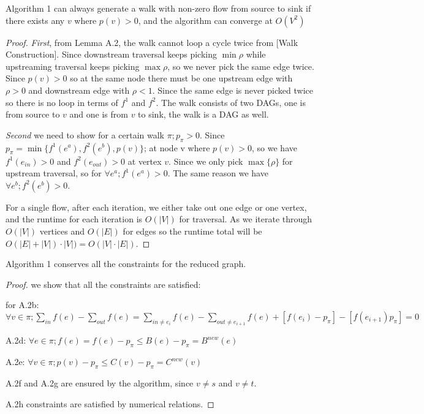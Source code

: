 \begin{lemma}   Algorithm 1 can always generate a walk with non-zero flow from source to sink if there exists any $v$ where $p(v) >0$, and the algorithm can converge at $O(V^2)$ \end{lemma}
\begin{proof}
\textit{First}, from Lemma A.2, the walk cannot loop a cycle twice from [Walk Construction]. Since downstream traversal keeps picking $\min \rho$ while upstreaming traversal keeps picking $\max \rho$, so we never pick the same edge twice. Since $p(v)>0$ so at the same node there must be one upstream edge with $\rho>0$ and downstream edge with $\rho<1$. Since the same edge is never picked twice so there is no loop in terms of $f^1$ and $f^2$. The walk consists of two DAGs, one is from source to $v$ and one is from $v$ to sink, the walk is a DAG as well.

\textit{Second} we need to show for a certain walk $\pi; p_\pi>0$. Since $p_\pi =  \min\{f^1(e^a), f^2(e^b), p(v)\}$; at node v where $p(v)>0$, so we have $f^1(e_{in})>0$ and $f^2(e_{out})>0$ at vertex $v$. Since we only pick $\max\{\rho\}$ for upstream traversal, so for $\forall e^a; f^1(e^a)>0$. The same reason we have $\forall e^b; f^2(e^b)>0$.

For a single flow, after each iteration, we either take out one edge or one vertex, and the runtime for each iteration is $O(|V|)$ for traversal. As we iterate through $O(|V|)$ vertices and $O(|E|)$ for edges so the runtime total will be $O(|E|+|V|)\cdot |V|) = O(|V|\cdot |E|)$.
\end{proof}


\begin{lemma}  Algorithm 1 conserves all the constraints for the reduced graph.
\end{lemma}
\begin{proof}
we show that all the constraints are satisfied:

for A.2b:
$\forall v \in \pi; \sum\limits_{in}  f(e) - \sum\limits_{out} f(e)=\sum\limits_{in \not=e_i}  f(e) - \sum\limits_{out\not=e_{i+1} } f(e) +[f(e_i)-p_\pi ] - [f(e_{i+1}) p_\pi] = 0 $

A.2d:
$\forall e \in \pi; f(e) = f(e)-p_\pi \leq B(e)-p_\pi=B^{new}(e)$ 

A.2e:
$\forall v \in \pi; p(v) - p_\pi \leq C(v) - p_\pi =C^{new}(v)$

A.2f and A.2g are ensured by the algorithm, since $v\not=s $ and $ v\not=t$.

A.2h constraints are satisfied by numerical relations.
\end{proof}

